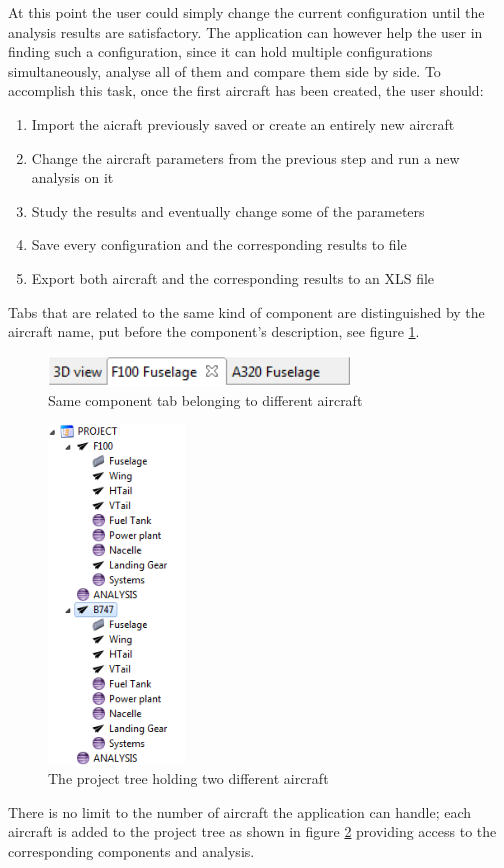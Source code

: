 %
At this point the user could simply change the current configuration until the analysis results are satisfactory. The application can however help the user in finding such a configuration, since it can hold multiple configurations simultaneously, analyse all of them and compare them side by side. To accomplish this task, once the first aircraft has been created, the user should:
%
\begin{enumerate}
	\setlength{\itemsep}{\medspacing}
	\item Import the aicraft previously saved or create an entirely new aircraft
	\item Change the aircraft parameters from the previous step and run a new analysis on it
	\item Study the results and eventually change some of the parameters
	\item Save every configuration and the corresponding results to file
	\item Export both aircraft and the corresponding results to an XLS file
\end{enumerate}
%
Tabs that are related to the same kind of component are distinguished by the aircraft name, put before the component's description, see figure \ref{fig:tabId}.
%
\begin{figure}[H]
	\centering
	\includegraphics[width=8cm]{images/gui/tabId}
	\caption{Same component tab belonging to different aircraft}
	\label{fig:tabId}
\end{figure}
%
\begin{figure}[H]
	\centering
	\includegraphics[height=9cm]{images/gui/projectTreeMulti}
	\caption{The project tree holding two different aircraft}
	\label{fig:projectTreeMulti}
\end{figure}
%
There is no limit to the number of aircraft the application can handle; each aircraft is added to the project tree as shown in figure \ref{fig:projectTreeMulti} providing access to the corresponding components and analysis.
%
